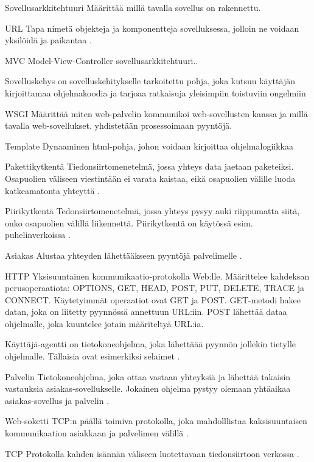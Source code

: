 \documentclass[utf8]{gradu3}
\begin{document}
\begin{thetermlist}
\item[Sovellusarkkitehtuuri] Määrittää millä tavalla sovellus on rakennettu.
\item[URL] Tapa nimetä objekteja ja komponentteja sovelluksessa, jolloin ne voidaan yksilöidä ja paikantaa \parencite{trends}.
\item[MVC] Model-View-Controller sovellusarkkitehtuuri..
\item[Sovelluskehys] on sovelluskehitykselle tarkoitettu pohja, joka kutsuu käyttäjän kirjoittamaa ohjelmakoodia ja tarjoaa ratkaisuja yleisimpiin toistuviin ongelmiin
\item[WSGI] Määrittää miten web-palvelin kommunikoi web-sovellusten kanssa ja millä tavalla web-sovellukset.
yhdistetään prosessoimaan pyyntöjä.
\item[Template] Dynaaminen html-pohja, johon voidaan kirjoittaa ohjelmalogiikkaa
\item[Pakettikytkentä] Tiedonsiirtomenetelmä, jossa yhteys data jaetaan paketeiksi. Osapuolien väliseen viestintään ei varata kaistaa, eikä osapuolien välille luoda katkeamatonta yhteyttä \parencite{kytkenta}.
\item[Piirikytkentä] Tedonsiirtomenetelmä, jossa yhteys pysyy auki riippumatta siitä, onko osapuolien välillä liikennettä. Piirikytkentä on käytössä esim. puhelinverkoissa \parencite{kytkenta}.
\item[Asiakas] Alustaa yhteyden lähettääkseen pyyntöjä palvelimelle \parencite{http}.
\item[HTTP] Yksisuuntainen kommunikaatio-protokolla Web:lle. Määrittelee kahdeksan perusoperaatiota: OPTIONS, GET, HEAD, POST, PUT, DELETE, TRACE ja CONNECT. Käytetyimmät operaatiot ovat GET ja POST. GET-metodi hakee datan, joka on liitetty pyynnössä annettuun URL:iin. POST lähettää dataa ohjelmalle, joka kuuntelee jotain määriteltyä URL:ia.
\item[Käyttäjä-agentti] on tietokoneohjelma, joka lähettäää pyynnön jollekin tietylle ohjelmalle. Tällaisia ovat esimerkiksi selaimet \parencite{http}. 
\item[Palvelin] Tietokoneohjelma, joka ottaa vastaan yhteyksiä ja lähettää takaisin vastauksia asiakas-sovellukselle. Jokainen ohjelma pystyy olemaan yhtäaikaa asiakas-sovellus ja palvelin \parencite{http}. 
\item[Web-soketti] TCP:n päällä toimiva protokolla, joka mahdolllistaa kaksisuuntaisen kommunikaation asiakkaan ja palvelimen välillä \parencite{websocket}.
\item[TCP] Protokolla kahden isännän väliseen luotettavaan tiedonsiirtoon verkossa  \parencite{tcp1_1}.
\end{thetermlist}
\end{document}
